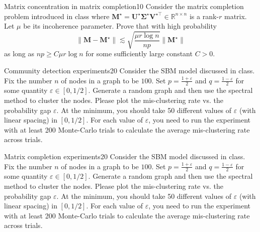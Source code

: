 \documentclass{article}
\begin{document}
\begin{problem}{Matrix concentration in matrix completion}{10}
	Consider the matrix completion problem introduced in class where $\bm{M}^{\star} = \bm{U}^\star \bm{\Sigma}^{\star} \bm{V}^{\star \top} \in \mathbb{R}^{n \times n}$ is a rank-$r$ matrix. Let $\mu$ be its incoherence parameter. Prove that with high probability 
	\[
	\|\bm{M} - \bm{M}^{\star}\| \lesssim \sqrt{\frac{\mu r \log n}{n p}} \|\bm{M}^\star\|
	\]
	as long as $n p \geq C \mu r \log n$ for some sufficiently large constant $C > 0$.
\end{problem}

\begin{problem}{Community detection experiments}{20}
Consider the SBM model discussed in class. Fix the number $n$ of nodes in a graph to be $100$. Set $p=\frac{1+ \varepsilon}{2}$ and $q=\frac{1-\varepsilon}{2}$ for some quantity $\varepsilon \in [0,1/2]$. Generate a random graph and then use the spectral method to cluster the nodes. Please plot the mis-clustering rate vs. the probability gap $\varepsilon$. At the minimum, you should take 50 different values of $\varepsilon$ (with linear spacing) in $[0, 1/2]$. For each value of $\varepsilon$, you need to run the experiment with at least 200 Monte-Carlo trials to calculate the average mis-clustering rate across trials. 
\end{problem}

\begin{problem}{Matrix completion experiments}{20}
Consider the SBM model discussed in class. Fix the number $n$ of nodes in a graph to be $100$. Set $p=\frac{1+ \varepsilon}{2}$ and $q=\frac{1-\varepsilon}{2}$ for some quantity $\varepsilon \in [0,1/2]$. Generate a random graph and then use the spectral method to cluster the nodes. Please plot the mis-clustering rate vs. the probability gap $\varepsilon$. At the minimum, you should take 50 different values of $\varepsilon$ (with linear spacing) in $[0, 1/2]$. For each value of $\varepsilon$, you need to run the experiment with at least 200 Monte-Carlo trials to calculate the average mis-clustering rate across trials. 
\end{problem}
\end{document}
